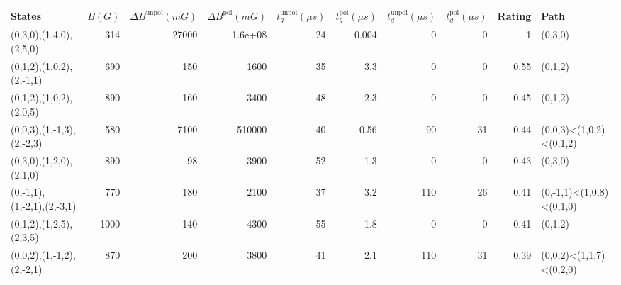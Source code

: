 \begin{tabular}{lrrrrrrrrl}
\hline
 {States}                   &   {$B(G)$} &   {$\Delta B^{\text{unpol}}(mG)$} &   {$\Delta B^{\text{pol}}(mG)$} &   {$t^{\text{unpol}}_{g}(\mu s)$} &   {$t^{\text{pol}}_{g}(\mu s)$} &   {$t^{\text{unpol}}_{d}(\mu s)$} &   {$t^{\text{pol}}_{d}(\mu s)$} &   {Rating} & {Path}                   \\
\hline
 (0,3,0),(1,4,0),(2,5,0)    &        314 &                             27000 &                         1.6e+08 &                                24 &                           0.004 &                                 0 &                               0 &       1    & (0,3,0)                  \\
 (0,1,2),(1,0,2),(2,-1,1)   &        690 &                               150 &                      1600       &                                35 &                           3.3   &                                 0 &                               0 &       0.55 & (0,1,2)                  \\
 (0,1,2),(1,0,2),(2,0,5)    &        890 &                               160 &                      3400       &                                48 &                           2.3   &                                 0 &                               0 &       0.45 & (0,1,2)                  \\
 (0,0,3),(1,-1,3),(2,-2,3)  &        580 &                              7100 &                    510000       &                                40 &                           0.56  &                                90 &                              31 &       0.44 & (0,0,3)<(1,0,2)<(0,1,2)  \\
 (0,3,0),(1,2,0),(2,1,0)    &        890 &                                98 &                      3900       &                                52 &                           1.3   &                                 0 &                               0 &       0.43 & (0,3,0)                  \\
 (0,-1,1),(1,-2,1),(2,-3,1) &        770 &                               180 &                      2100       &                                37 &                           3.2   &                               110 &                              26 &       0.41 & (0,-1,1)<(1,0,8)<(0,1,0) \\
 (0,1,2),(1,2,5),(2,3,5)    &       1000 &                               140 &                      4300       &                                55 &                           1.8   &                                 0 &                               0 &       0.41 & (0,1,2)                  \\
 (0,0,2),(1,-1,2),(2,-2,1)  &        870 &                               200 &                      3800       &                                41 &                           2.1   &                               110 &                              31 &       0.39 & (0,0,2)<(1,1,7)<(0,2,0)  \\
\hline
\end{tabular}